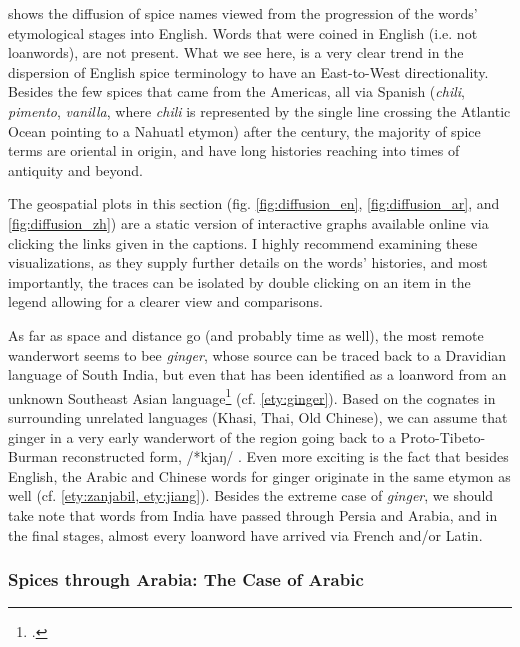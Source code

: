  shows the diffusion of spice names viewed from the progression of the words' etymological stages into English. Words that were coined in English (i.e. not loanwords), are not present. What we see here, is a very clear trend in the dispersion of English spice terminology to have an East-to-West directionality. Besides the few spices that came from the Americas, all via Spanish (\textit{chili}, \textit{pimento}, \textit{vanilla}, where \textit{chili} is represented by the single line crossing the Atlantic Ocean pointing to a Nahuatl etymon) after the  century, the majority of spice terms are oriental in origin, and have long histories reaching into times of antiquity and beyond. 


\begin{note}
  The geospatial plots in this section (fig. \ref{fig:diffusion_en}, \ref{fig:diffusion_ar}, and \ref{fig:diffusion_zh}) are a static version of interactive graphs available online via clicking the links given in the captions. I highly recommend examining these visualizations, as they supply further details on the words' histories, and most importantly, the traces can be isolated by double clicking on an item in the legend allowing for a clearer view and comparisons.
\end{note}

As far as space and distance go (and probably time as well), the most remote \gls{wanderwort} seems to bee \textit{ginger}, whose source can be traced back to a Dravidian language of South India, but even that has been identified as a loanword from an unknown Southeast Asian language\footcite[ginger]{oed} (cf. \ref{ety:ginger}). Based on the cognates in surrounding unrelated languages (Khasi, Thai, Old Chinese), we can assume that ginger in a very early \gls{wanderwort} of the region going back to a Proto-Tibeto-Burman reconstructed form, /*kjaŋ/ \autocite[302]{matisoff_handbook_2003}. Even more exciting is the fact that besides English, the Arabic and Chinese words for ginger originate in the same etymon as well (cf. \ref{ety:zanjabil, ety:jiang}).
Besides the extreme case of \textit{ginger}, we should take note that words from India have passed through Persia and Arabia, and in the final stages, almost every loanword have arrived via French and/or Latin. 

\subsubsection{Spices through Arabia: The Case of Arabic}

